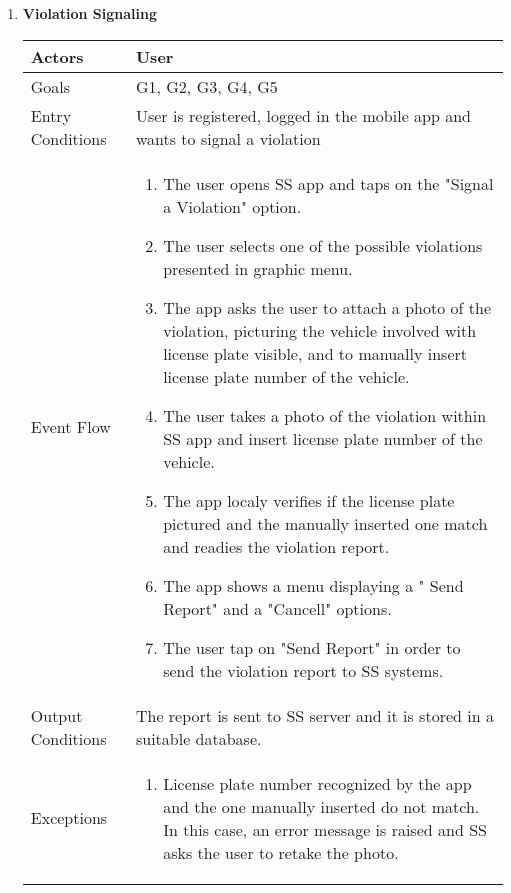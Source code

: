 \begin{enumerate}
	\item \textbf{Violation Signaling}
		\begin{table}[h!]
		\begin{tabular}{|l|p{}|}
		\hline
		Actors            			&       	User\\ \hline
		Goals             			&         G1, G2, G3, G4, G5	\\ \hline
		Entry Conditions  	&  		User is registered, logged in the mobile app and wants to signal a violation\\ \hline
		Event Flow        		&          
				\begin{enumerate}[label=\alph*)]
					\item The user opens SS app and taps on the "Signal a Violation" option.
					\item The user selects one of the possible violations presented in graphic menu.
					\item The app asks the user to attach a photo of the violation, picturing the vehicle involved with license plate visible, and to manually insert license plate number of the vehicle.
					\item The user takes a photo of the violation within SS app and insert license plate number of the vehicle.
					\item The app localy verifies if the license plate pictured and the manually inserted one match and readies the violation report. 
					\item The app shows a menu displaying a " Send Report" and a "Cancell" options.
					\item The user tap on "Send Report" in order to send the violation report to SS systems.
					\end{enumerate}\\ \hline
		Output Conditions &    		The report is sent to SS server and it is stored in a suitable database.\\ \hline
		Exceptions        		&       	
				\begin{enumerate}[label=\alph*)]
					\item License plate number recognized by the app and the one manually inserted do not match. In this case, an error message is raised and SS asks the user to retake the photo.
				\end{enumerate}\\ \hline
	\end{tabular}
	\end{table}
	

\end{enumerate}
